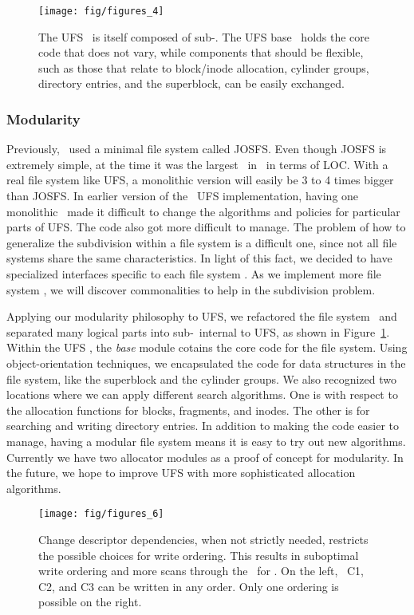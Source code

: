\begin{figure}[tb]
  \centering
  \texttt{[image: fig/figures\_4]}
  \caption{\label{fig:ufsmodules} The UFS \module\ is itself composed of
  sub-\modules. The UFS base \module\ holds the core code that does not
  vary, while components that should be flexible, such as those that relate
  to block/inode allocation, cylinder groups, directory entries, and the
  superblock, can be easily exchanged.}
\end{figure}

\subsubsection {Modularity}
Previously, \Kudos\ used a minimal file system called JOSFS. Even though JOSFS
is extremely simple, at the time it was the largest \module\ in \Kudos\ in
terms of LOC. With a real file system like UFS, a monolithic version will
easily be 3 to 4 times bigger than JOSFS. In earlier version of the \Kudos\ UFS
implementation, having one monolithic \module\ made it difficult to change the
algorithms and policies for particular parts of UFS. The code also got more
difficult to manage. The problem of how to generalize the subdivision within
a file system is a difficult one, since not all file systems share the same
characteristics. In light of this fact, we decided to have specialized
interfaces specific to each file system \module. As we implement more file
system \modules, we will discover commonalities to help in the subdivision
problem.

Applying our modularity philosophy to UFS, we refactored the file system
\module\ and separated many logical parts into sub-\modules\ internal to UFS,
as shown in Figure~\ref{fig:ufsmodules}.
Within the UFS \module, the \emph{base} module cotains the core code for the
file system. Using object-orientation techniques, we encapsulated the code
for data structures in the file system, like the superblock and the cylinder
groups. We also recognized two locations where we can apply different
search algorithms. One is with respect to the allocation functions for blocks,
fragments, and inodes. The other is for searching and writing directory
entries. In addition to making the code easier to manage, having a modular
file system means it is easy to try out new algorithms. Currently we have
two allocator modules as a proof of concept for modularity. In the future,
we hope to improve UFS with more sophisticated allocation algorithms.

\begin{figure}[htb]
  \centering
  \texttt{[image: fig/figures\_6]}
  \caption{\label{fig:chdescarrange} Change descriptor dependencies, when
  not strictly needed, restricts the possible choices for write ordering.
  This results in suboptimal write ordering and more scans through the
  \chdescs\ for \Kudos. On the left, \chdescs\ C1, C2, and C3 can be written
  in any order. Only one ordering is possible on the right.}
\end{figure}

